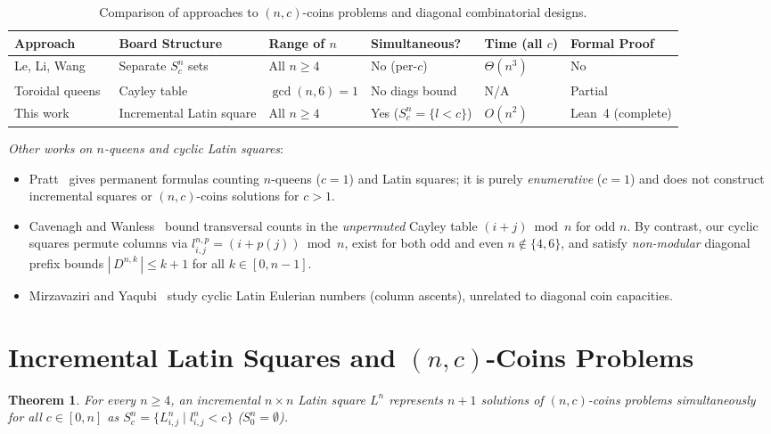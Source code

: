 \documentclass[10pt,a4paper]{article}
\newtheorem{theorem}{Theorem}[section]
\theoremstyle{remark}
\begin{document}
\begin{table}[htbp]
\centering
\scriptsize
\begin{tabular}{@{}llllll@{}}
\toprule
Approach & Board Structure & Range of $n$ & Simultaneous? & Time (all $c$) & Formal Proof \\
\midrule
Le, Li, Wang~\cite{LLW1990} & Separate $S^n_c$ sets & All $n \ge 4$ & No (per-$c$) & $\Theta(n^3)$ & No \\
Toroidal queens~\cite{BS2009,CW2010} & Cayley table & $\gcd(n,6) = 1$ & No diags bound & N/A & Partial \\
This work & Incremental Latin square & All $n \ge 4$ & Yes ($S^n_c = \{l < c\}$) & $O(n^2)$ & Lean~4 (complete) \\
\bottomrule
\end{tabular}
\caption{Comparison of approaches to $(n,c)$-coins problems and diagonal combinatorial designs.}
\label{tab:comparison}
\end{table}

\emph{Other works on $n$-queens and cyclic Latin squares}:
\begin{itemize}[nosep]
\item Pratt~\cite{Pratt2016} gives permanent formulas counting $n$-queens ($c = 1$) and Latin squares;
it is purely \emph{enumerative} ($c = 1$) and does not construct incremental squares or $(n,c)$-coins
solutions for $c > 1$.
\item Cavenagh and Wanless~\cite{CW2010} bound transversal counts in the \emph{unpermuted} Cayley table
$(i + j) \bmod n$ for odd $n$. By contrast, our cyclic squares permute columns via
$l^{n,p}_{i,j} = (i + p(j)) \bmod n$, exist for both odd and even $n \notin \{4,6\}$, and satisfy
\emph{non-modular} diagonal prefix bounds $|\,D^{n,k}\,| \le k + 1$ for all $k \in [0,n-1]$.
\item Mirzavaziri and Yaqubi~\cite{MY2026} study cyclic Latin Eulerian numbers (column ascents),
unrelated to diagonal coin capacities.
\end{itemize}

\section[Incremental Latin Squares and (n,c)-Coins Problems]{Incremental Latin Squares and $(n,c)$-Coins Problems}

\begin{theorem}\label{thm:main1}
For every $n \ge 4$, an incremental $n \!\times\! n$ Latin square $L^n$ represents $n + 1$ solutions
of $(n,c)$-coins problems \emph{simultaneously} for all $c \in [0,n]$ as
$S^n_c = \{L^n_{i,j} \mid l^n_{i,j} < c\}$ ($S^n_0 = \emptyset$).
\end{theorem}
\end{document}
